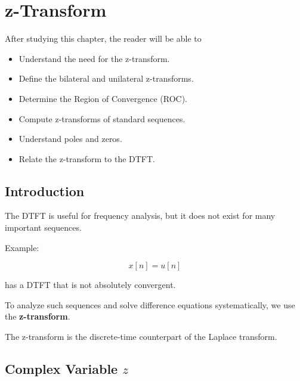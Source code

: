
\chapter{z-Transform}

\begin{tcolorbox}[colback=blue!5!white,colframe=blue!70!black,title=Learning Objectives]

After studying this chapter, the reader will be able to

\begin{itemize}
\item Understand the need for the z-transform.
\item Define the bilateral and unilateral z-transforms.
\item Determine the Region of Convergence (ROC).
\item Compute z-transforms of standard sequences.
\item Understand poles and zeros.
\item Relate the z-transform to the DTFT.
\end{itemize}

\end{tcolorbox}


\section{Introduction}

The DTFT is useful for frequency analysis, but it does not exist for many important
sequences.

Example:

\[
x[n]=u[n]
\]

has a DTFT that is not absolutely convergent.

To analyze such sequences and solve difference equations systematically, we use the
\textbf{z-transform}.

The z-transform is the discrete-time counterpart of the Laplace transform.


\section{Complex Variable \(z\)}

